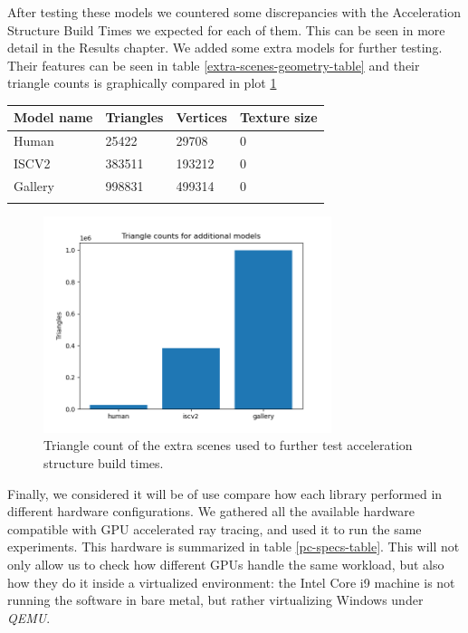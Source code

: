 After testing these models we countered some discrepancies with the Acceleration Structure Build Times we expected for each of them. This can be seen in more detail in the Results chapter. We added some extra models for further testing. Their features can be seen in table \ref{extra-scenes-geometry-table} and their triangle counts is graphically compared in plot \ref{extra-scenes-geometry-graph}

\begin{center}
  \begin{tabular}{ | m{3cm} | m{3cm}| m{3cm}|m{3cm} |}
  \hline
  Model name& Triangles& Vertices& Texture size\\
  \hline
    Human& 25422& 29708& 0\\
  \hline
    ISCV2& 383511& 193212& 0\\
  \hline
    Gallery& 998831& 499314& 0\\
  \label{extra-scenes-geometry-table}
\end{tabular}
\end{center}

\begin{figure}[hbt!]
  \centering
  \includegraphics[width=0.75\textwidth]{figuras/extra-scenes-geometry.png}
  \caption{Triangle count of the extra scenes used to further test acceleration structure build times.}
  \label{extra-scenes-geometry-graph}
\end{figure}

Finally, we considered it will be of use compare how each library performed in different hardware configurations. We gathered all the available hardware compatible with GPU accelerated ray tracing, and used it to run the same experiments. This hardware is summarized in table \ref{pc-specs-table}. This will not only allow us to check how different GPUs handle the same workload, but also how they do it inside a virtualized environment: the Intel Core i9 machine is not running the software in bare metal, but rather virtualizing Windows under \textit{QEMU}.

